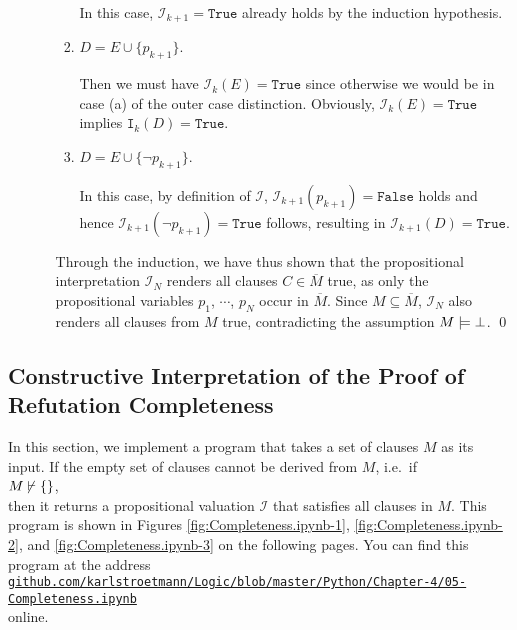 \begin{enumerate}
\begin{enumerate}
\begin{enumerate}[1.]
          In this case, $\mathcal{I}_{k+1} = \mathtt{True}$ already holds by the induction hypothesis.        
    \item $D = E \cup \{ p_{k+1} \}$.

          Then we must have $\mathcal{I}_k(E) = \mathtt{True}$ since otherwise we would be in case (a) of the
          outer case distinction.  Obviously, $\mathcal{I}_k(E) = \mathtt{True}$ implies $\mathtt{I}_k(D) = \mathtt{True}$.
    \item $D = E \cup \{ \neg p_{k+1} \}$.

          In this case, by definition of $\mathcal{I}$, $\mathcal{I}_{k+1}(p_{k+1}) = \mathtt{False}$
          holds and hence $\mathcal{I}_{k+1}(\neg p_{k+1}) = \mathtt{True}$ follows, resulting in
          $\mathcal{I}_{k+1}(D) = \mathtt{True}$.
    \end{enumerate}
    
    Through the induction, we have thus shown that the propositional interpretation
    $\mathcal{I}_{N}$ renders all clauses $C \in \overline{M}$ true, as only the
    propositional variables $p_1$, $\cdots$, $p_N$ occur in $\overline{M}$.
    Since $M \subseteq \overline{M}$, $\mathcal{I}_{N}$ also renders all clauses from $M$ true, 
    contradicting the assumption $M \models \bot$. \qed
  \end{enumerate}
\end{enumerate}

\subsection{Constructive Interpretation of the Proof of Refutation Completeness}
In this section, we implement a program that takes a set of clauses $M$ as its input.
If the empty set of clauses cannot be derived from $M$, i.e.~if
\\[0.2cm]
\hspace*{1.3cm}
$M\, {\not}\!\vdash \{\}$,
\\[0.2cm]
then it returns a propositional valuation $\mathcal{I}$ that satisfies all clauses in $M$.
This program is shown in Figures \ref{fig:Completeness.ipynb-1}, \ref{fig:Completeness.ipynb-2}, and \ref{fig:Completeness.ipynb-3} on the following pages. You can find this program at the address
\\[0.2cm]
\hspace*{0.3cm}
\href{https://github.com/karlstroetmann/Logic/blob/master/Python/Chapter-4/05-Completeness.ipynb}{\texttt{github.com/karlstroetmann/Logic/blob/master/Python/Chapter-4/05-Completeness.ipynb}}
\\[0.2cm]
online.

